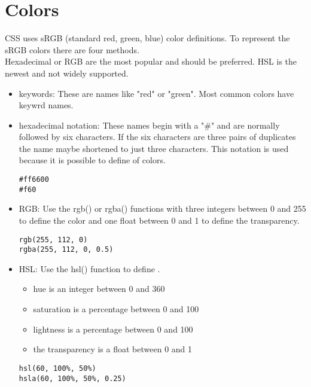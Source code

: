 \documentclass{article}
\begin{document}
\section{Colors}
CSS uses sRGB (standard red, green, blue) color definitions. To represent the
sRGB colors there are four methods.\\
Hexadecimal or RGB are the most popular and should be preferred. HSL is the
newest and not widely supported.
\begin{itemize}
  \item keywords: These are names like "red" or "green". Most common colors
    have keywrd names.
  \item hexadecimal notation: These names begin with a "\#" and are normally
    followed by six characters. If the six characters are three pairs of
    duplicates the name maybe shortened to just three characters. This notation
    is used because it is possible to define {\color{red}{millions}} of colors.

\begin{lstlisting}
#ff6600
#f60
\end{lstlisting}

  \item RGB: Use the rgb() or rgba() functions with three integers between 0
    and 255 to define the color and one float between 0 and 1 to define
    the transparency.

\begin{lstlisting}
rgb(255, 112, 0)
rgba(255, 112, 0, 0.5)
\end{lstlisting}

  \item HSL: Use the hsl() function to define
    {\color{red}{hue, saturation, and lightness}}.
    \begin{itemize}
      \item hue is an integer between 0 and 360
      \item saturation is a percentage between 0 and 100
      \item lightness is a percentage between 0 and 100
      \item the transparency is a float between 0 and 1
    \end{itemize}

\begin{lstlisting}
hsl(60, 100%, 50%)
hsla(60, 100%, 50%, 0.25)
\end{lstlisting}

\end{itemize}
\end{document}
